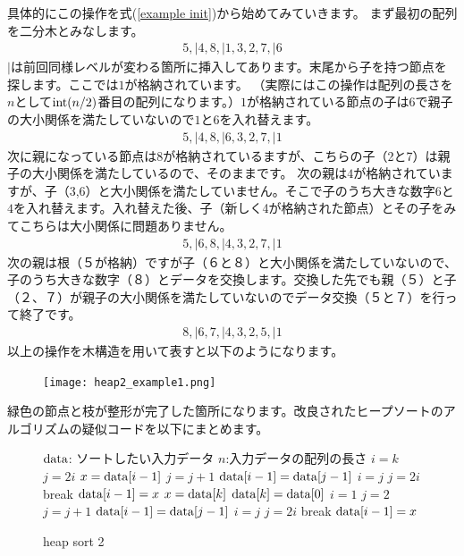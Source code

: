 \documentclass[dvipdfmx,pic,eepic,ecltree]{jarticle}
\begin{document}
具体的にこの操作を式(\ref{example init})から始めてみていきます。
まず最初の配列を二分木とみなします。
\begin{eqnarray}
5, |4, 8, |1, 3, 2, 7,| 6
\end{eqnarray}
$|$は前回同様レベルが変わる箇所に挿入してあります。末尾から子を持つ節点を探します。ここでは$1$が格納されています。
（実際にはこの操作は配列の長さを$n$として${\rm int}(n/2)$番目の配列になります。）$1$が格納されている節点の子は$6$で親子の大小関係を満たしていないので$1$と$6$を入れ替えます。
\begin{eqnarray}
5,| 4, 8,| 6, 3, 2, 7,| 1
\end{eqnarray}
次に親になっている節点は$8$が格納されているますが、こちらの子（2と7）は親子の大小関係を満たしているので、そのままです。
次の親は$4$が格納されていますが、子（3,6）と大小関係を満たしていません。そこで子のうち大きな数字$6$と$4$を入れ替えます。入れ替えた後、子（新しく4が格納された節点）とその子をみてこちらは大小関係に問題ありません。
\begin{eqnarray}
5,| 6, 8,| 4, 3, 2, 7,| 1
\end{eqnarray}
次の親は根（５が格納）ですが子（６と８）と大小関係を満たしていないので、子のうち大きな数字（８）とデータを交換します。交換した先でも親（５）と子（２、７）が親子の大小関係を満たしていないのでデータ交換（５と７）を行って終了です。
\begin{eqnarray}
8, |6, 7,| 4, 3, 2, 5, |1
\end{eqnarray}
以上の操作を木構造を用いて表すと以下のようになります。
 \begin{figure}[H]
 \begin{center}
\texttt{[image: heap2\_example1.png]}
\end{center}
\end{figure}
緑色の節点と枝が整形が完了した箇所になります。改良されたヒープソートのアルゴリズムの疑似コードを以下にまとめます。
\begin{figure}[H]
\begin{algorithm}[H]
	\caption{heap sort 2}
	\label{heap sort 2}
	\begin{algorithmic}[1]
	\STATE ${\rm data}$: ソートしたい入力データ
	\STATE $n$:入力データの配列の長さ
	\STATE $i=k$
	\STATE $j=2i$
	\STATE $x = {\rm data}[i-1]$
	\STATE $j=j+1$
	\ENDIF
	\STATE ${\rm data}[i-1] = {\rm data}[j-1]$
	\STATE $i=j$
	\STATE $j=2i$
	\ELSE
	\STATE break
	\ENDIF
	\ENDWHILE
	\STATE ${\rm data}[i-1]=x$
	\ENDFOR
	\STATE $x={\rm data}[k]$
	\STATE ${\rm data}[k] = {\rm data}[0]$
	\STATE $i=1$
	\STATE $j=2$
	\STATE $j = j +1$
	\ENDIF
	\STATE ${\rm data}[i-1] = {\rm data}[j-1]$
	\STATE $i=j$
	\STATE $j=2i$
	\ELSE
	\STATE break
	\ENDIF
	\ENDWHILE
	\STATE ${\rm data}[i-1]=x$
	\ENDFOR
	\end{algorithmic}
\end{algorithm}
\end{figure}
\end{document}
